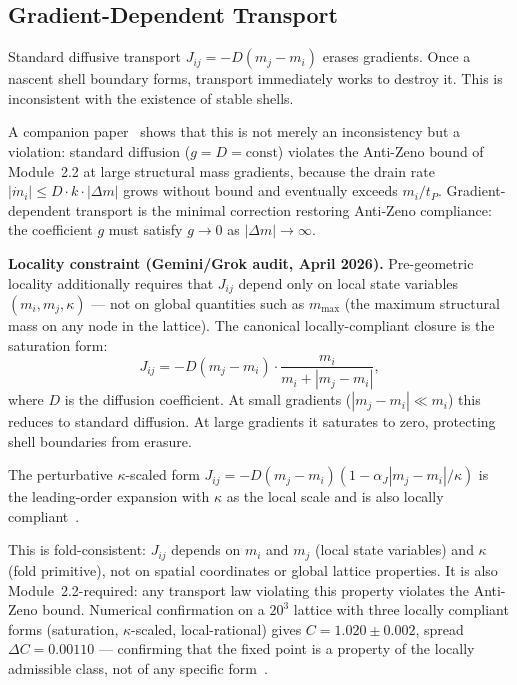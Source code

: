 \documentclass[12pt]{article}
\begin{document}
\subsection{Gradient-Dependent Transport}

Standard diffusive transport $J_{ij} = -D(m_j - m_i)$ erases
gradients. Once a nascent shell boundary forms, transport immediately
works to destroy it. This is inconsistent with the existence of
stable shells.

A companion paper~\cite{transport_deriv} shows that this
is not merely an inconsistency but a violation: standard diffusion
($g = D = \mathrm{const}$) violates the Anti-Zeno bound of
Module~2.2 at large structural mass gradients, because the drain
rate $|\dot{m}_i| \leq D \cdot k \cdot |\Delta m|$ grows without
bound and eventually exceeds $m_i/t_P$.
Gradient-dependent transport is the minimal correction restoring
Anti-Zeno compliance: the coefficient $g$ must satisfy
$g \to 0$ as $|\Delta m| \to \infty$.

\textbf{Locality constraint (Gemini/Grok audit, April 2026).}
Pre-geometric locality additionally requires that $J_{ij}$
depend only on local state variables $(m_i, m_j, \kappa)$ ---
not on global quantities such as $m_{\max}$ (the maximum
structural mass on any node in the lattice).
The canonical locally-compliant closure is the saturation form:
\begin{equation}
  J_{ij} = -D(m_j - m_i)\cdot\frac{m_i}{m_i + |m_j - m_i|},
  \label{eq:grad_transport}
\end{equation}
where $D$ is the diffusion coefficient.
At small gradients ($|m_j-m_i| \ll m_i$) this reduces to
standard diffusion. At large gradients it saturates to zero,
protecting shell boundaries from erasure.

The perturbative $\kappa$-scaled form
$J_{ij} = -D(m_j-m_i)(1 - \alpha_J|m_j-m_i|/\kappa)$
is the leading-order expansion with $\kappa$ as the local
scale and is also locally compliant~\cite{transport_deriv}.

This is fold-consistent: $J_{ij}$ depends on $m_i$ and $m_j$
(local state variables) and $\kappa$ (fold primitive),
not on spatial coordinates or global lattice properties.
It is also Module~2.2-required: any transport law violating
this property violates the Anti-Zeno bound.
Numerical confirmation on a $20^3$ lattice with three
locally compliant forms (saturation, $\kappa$-scaled,
local-rational) gives $C = 1.020 \pm 0.002$,
spread $\Delta C = 0.00110$ --- confirming that the
fixed point is a property of the locally admissible class,
not of any specific form~\cite{transport_deriv}.
\end{document}
